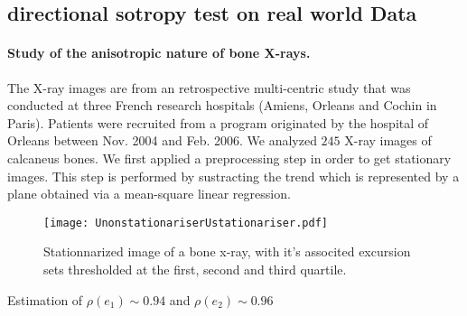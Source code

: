 \documentclass[12pt]{article}
\theoremstyle{Theorem}
\theoremstyle{definition}
\begin{document}
\subsection{directional sotropy test on real world Data}
\paragraph{Study of the anisotropic nature of bone X-rays.}
The X-ray images are from an retrospective multi-centric study that was conducted at
three French research hospitals (Amiens, Orleans and Cochin in Paris). Patients were recruited from a program originated by the hospital of Orleans between Nov. 2004 and Feb. 2006. We analyzed $245$ X-ray images of calcaneus bones. 
We first applied a preprocessing step in order to get stationary images. This step is performed by sustracting the trend which is represented by a plane obtained via a mean-square linear regression.
\begin{figure}[H]
\centering
{\texttt{[image: UnonstationariserUstationariser.pdf]}}
 \caption{Stationnarized image of a bone x-ray, with it's associted excursion sets thresholded at the first, second and third quartile.}
\label{fig22}
\end{figure}
Estimation of $\rho(e_1)\sim0.94$ and $\rho(e_2)\sim0.96$
\end{document}
